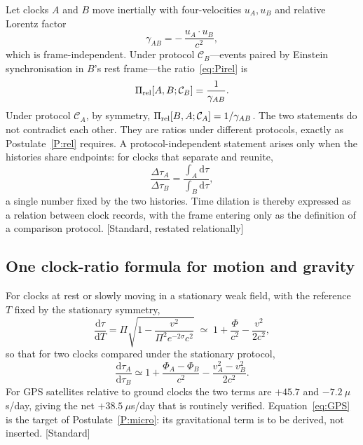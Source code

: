 \documentclass[11pt]{article}
\newcommand{\Pg}{\Pi}                 %
\newcommand{\sgP}{\sigma}             %
\newcommand{\dd}{\mathrm{d}}
\newcommand{\Tref}{T}                 %
\newcommand{\st}[1]{\textsf{\small[#1]}}
\theoremstyle{plain}
\theoremstyle{definition}
\theoremstyle{remark}
\begin{document}
Let clocks $A$ and $B$ move inertially with four-velocities $u_A,u_B$ and relative Lorentz factor
\begin{equation}
\gamma_{AB} = -\,\frac{u_A\cdot u_B}{c^2},
\end{equation}
which is frame-independent. Under protocol $\mathcal C_B$---events paired by Einstein synchronisation in $B$'s rest frame---the ratio~\eqref{eq:Pirel} is
\begin{equation}
\Pg_{\rm rel}[A,B;\mathcal C_B] = \frac{1}{\gamma_{AB}}.
\label{eq:SRratio}
\end{equation}
Under protocol $\mathcal C_A$, by symmetry, $\Pg_{\rm rel}[B,A;\mathcal C_A]=1/\gamma_{AB}$. The two statements do not contradict each other. They are ratios under different protocols, exactly as Postulate~\ref{P:rel} requires. A protocol-independent statement arises only when the histories share endpoints: for clocks that separate and reunite,
\begin{equation}
\frac{\Delta\tau_A}{\Delta\tau_B} = \frac{\int_A \dd\tau}{\int_B \dd\tau},
\end{equation}
a single number fixed by the two histories. Time dilation is thereby expressed as a relation between clock records, with the frame entering only as the definition of a comparison protocol. \st{Standard, restated relationally}

\subsection{One clock-ratio formula for motion and gravity}

For clocks at rest or slowly moving in a stationary weak field, with the reference $\Tref$ fixed by the stationary symmetry,
\begin{equation}
\frac{\dd\tau}{\dd\Tref} = \Pg\sqrt{1-\frac{v^2}{\Pg^2 e^{-2\sgP}c^2}}
\;\simeq\; 1+\frac{\Phi}{c^2}-\frac{v^2}{2c^2},
\label{eq:clockrate}
\end{equation}
so that for two clocks compared under the stationary protocol,
\begin{equation}
\frac{\dd\tau_A}{\dd\tau_B} \simeq 1+\frac{\Phi_A-\Phi_B}{c^2}-\frac{v_A^2-v_B^2}{2c^2}.
\label{eq:GPS}
\end{equation}
For GPS satellites relative to ground clocks the two terms are $+45.7$ and $-7.2\ \mu$s/day, giving the net $+38.5\ \mu$s/day that is routinely verified. Equation~\eqref{eq:GPS} is the target of Postulate~\ref{P:micro}: its gravitational term is to be derived, not inserted. \st{Standard}
\end{document}
